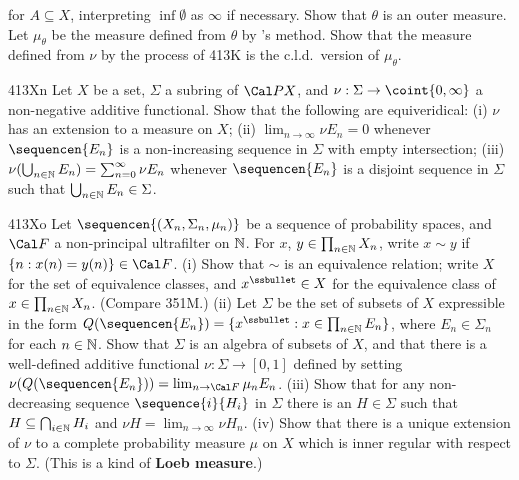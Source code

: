 {

\noindent for $A\subseteq X$, interpreting $\inf\emptyset$ as $\infty$
if necessary.   Show that $\theta$ is an outer measure.   Let
$\mu_{\theta}$ be
the measure defined from $\theta$ by \Caratheodory's method.   Show
that the measure defined from $\nu$ by the process of 413K is the
c.l.d.\ version
of $\mu_{\theta}$.   

\sqheader 413Xn Let $X$ be a set, $\Sigma$ a subring of $\Cal PX$, and
$\nu:\Sigma\to\coint{0,\infty}$ a non-negative additive functional.
Show that the following are equiveridical:  (i) $\nu$ has an extension to a measure on $X$;  (ii) $\lim_{n\to\infty}\nu E_n=0$ whenever
$\sequencen{E_n}$ is a
non-increasing sequence in $\Sigma$ with empty intersection;  (iii)
$\nu(\bigcup_{n\in\Bbb N}E_n)=\sum_{n=0}^{\infty}\nu E_n$ whenever
$\sequencen{E_n}$ is a disjoint sequence in $\Sigma$ such that
$\bigcup_{n\in\Bbb N}E_n\in\Sigma$.

\sqheader 413Xo Let $\sequencen{(X_n,\Sigma_n,\mu_n)}$ be a sequence of
probability spaces, and $\Cal F$ a non-principal ultrafilter on
$\Bbb N$.   For $x$, $y\in\prod_{n\in\Bbb N}X_n$, write $x\sim y$ if
$\{n:x(n)=y(n)\}\in\Cal F$.   (i) Show that $\sim$ is an equivalence
relation;  write $X$ for the set of equivalence classes, and
$x^{\ssbullet}\in X$ for the equivalence class of
$x\in\prod_{n\in\Bbb N}X_n$.  (Compare 351M.)   (ii) Let $\Sigma$ be the
set of subsets of $X$ expressible in the form
$Q(\sequencen{E_n})=\{x^{\ssbullet}:x\in\prod_{n\in\Bbb N}E_n\}$, where
$E_n\in\Sigma_n$ for each $n\in\Bbb N$.   Show that $\Sigma$ is an
algebra of subsets of $X$, and that there is a well-defined additive
functional $\nu:\Sigma\to[0,1]$ defined by setting
$\nu(Q(\sequencen{E_n}))=\lim_{n\to\Cal F}\mu_nE_n$.   (iii) Show that
for any non-decreasing sequence $\sequence{i}{H_i}$ in $\Sigma$ there is
an $H\in\Sigma$ such that $H\subseteq\bigcap_{i\in\Bbb N}H_i$ and $\nu
H=\lim_{n\to\infty}\nu H_n$.      (iv) Show that there is a unique
extension of
$\nu$ to a complete probability measure $\mu$ on $X$ which is inner regular with
respect to $\Sigma$.   (This is a kind of {\bf Loeb measure}.)

}
